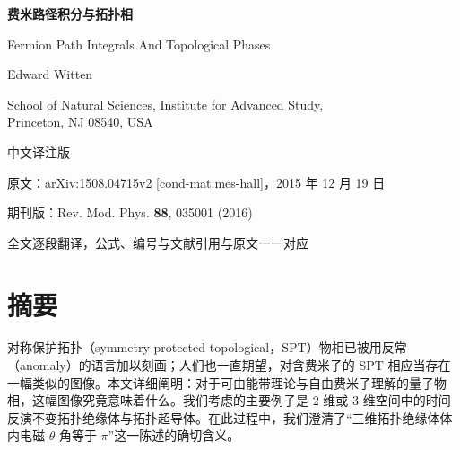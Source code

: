 
\begin{titlepage}
\centering
\vspace*{1.2cm}

{\LARGE\bfseries 费米路径积分与拓扑相\par}
\vspace{0.5cm}
{\large Fermion Path Integrals And Topological Phases\par}
\vspace{1.6cm}
{\large Edward Witten\par}
\vspace{0.35cm}
{\small School of Natural Sciences, Institute for Advanced Study,\\
Princeton, NJ 08540, USA\par}
\vspace{1.8cm}

{\large 中文译注版\par}
\vspace{0.4cm}
{\small 原文：arXiv:1508.04715v2 [cond-mat.mes-hall]，2015 年 12 月 19 日\par}
{\small 期刊版：Rev. Mod. Phys. \textbf{88}, 035001 (2016)\par}
\vspace{1.5cm}

{\small 全文逐段翻译，公式、编号与文献引用与原文一一对应\par}
\vfill
\end{titlepage}

\section*{摘要}

对称保护拓扑（symmetry-protected topological，SPT）物相已被用反常（anomaly）的语言加以刻画；人们也一直期望，对含费米子的 SPT 相应当存在一幅类似的图像。本文详细阐明：对于可由能带理论与自由费米子理解的量子物相，这幅图像究竟意味着什么。我们考虑的主要例子是 2 维或 3 维空间中的时间反演不变拓扑绝缘体与拓扑超导体。在此过程中，我们澄清了“三维拓扑绝缘体体内电磁 $\theta$ 角等于 $\pi$”这一陈述的确切含义。

